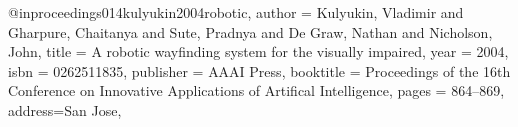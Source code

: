@inproceedings{014kulyukin2004robotic,
author = {Kulyukin, Vladimir and Gharpure, Chaitanya and Sute, Pradnya and De Graw, Nathan and Nicholson, John},
title = {A robotic wayfinding system for the visually impaired},
year = {2004},
isbn = {0262511835},
publisher = {AAAI Press},
booktitle = {Proceedings of the 16th Conference on Innovative Applications of Artifical Intelligence},
pages = {864–869},
address={San Jose},
}